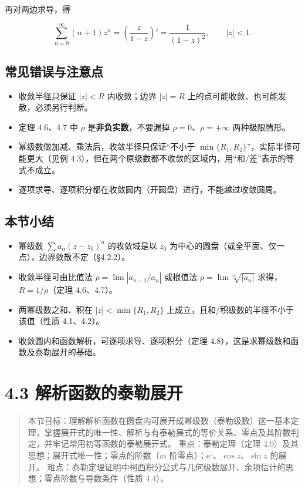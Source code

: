 再对两边求导，得

\[
\sum_{n=0}^{\infty}(n+1)z^n=\left(\frac{z}{1-z}\right)'=\frac{1}{(1-z)^2},\qquad |z|<1 .
\]

\subsection{常见错误与注意点}\label{ux5e38ux89c1ux9519ux8befux4e0eux6ce8ux610fux70b9-12}

\begin{itemize}
\tightlist
\item
  收敛半径只保证 \(|z|<R\) 内收敛；边界 \(|z|=R\)
  上的点可能收敛、也可能发散，必须另行判断。
\item
  定理 4.6、4.7 中 \(\rho\) 是\textbf{非负实数}，不要漏掉
  \(\rho=0\)、\(\rho=+\infty\) 两种极限情形。
\item
  幂级数做加减、乘法后，收敛半径只保证``不小于
  \(\min\{R_1,R_2\}\)''，实际半径可能更大（见例
  4.3），但在两个原级数都不收敛的区域内，用``和/差''表示的等式不成立。
\item
  逐项求导、逐项积分都在收敛圆内（开圆盘）进行，不能越过收敛圆周。
\end{itemize}

\subsection{本节小结}\label{ux672cux8282ux5c0fux7ed3-12}

\begin{itemize}
\tightlist
\item
  幂级数 \(\sum a_n(z-z_0)^n\) 的收敛域是以 \(z_0\)
  为中心的圆盘（或全平面、仅一点），边界敛散不定（§4.2.2）。
\item
  收敛半径可由比值法 \(\rho=\lim|a_{n+1}/a_n|\) 或根值法
  \(\rho=\lim\sqrt[n]{|a_n|}\) 求得，\(R=1/\rho\)（定理 4.6、4.7）。
\item
  两幂级数之和、积在 \(|z|<\min\{R_1,R_2\}\)
  上成立，且和/积级数的半径不小于该值（性质 4.1、4.2）。
\item
  收敛圆内和函数解析，可逐项求导、逐项积分（定理
  4.8），这是求幂级数和函数及泰勒展开的基础。
\end{itemize}

\section{4.3
解析函数的泰勒展开}\label{ux89e3ux6790ux51fdux6570ux7684ux6cf0ux52d2ux5c55ux5f00}

\begin{quote}
本节目标：理解解析函数在圆盘内可展开成幂级数（泰勒级数）这一基本定理，掌握展开式的唯一性、解析与有泰勒展式的等价关系、零点及其阶数判定，并牢记常用初等函数的泰勒展开式。
重点：泰勒定理（定理 4.9）及其思想；展开式唯一性；零点的阶数（\(m\)
阶零点）；\(\mathrm{e}^z\)、\(\cos z\)、\(\sin z\) 的展开。
难点：泰勒定理证明中柯西积分公式与几何级数展开、余项估计的思想；零点阶数与导数条件（性质
4.4）。
\end{quote}

